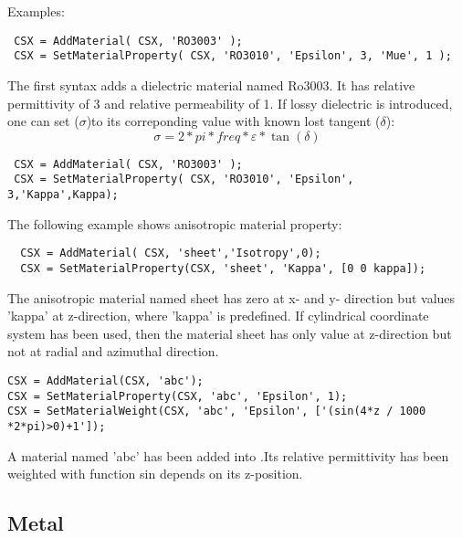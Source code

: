 \begin{FontDescr}{Examples:}

\begin{lstlisting}
 CSX = AddMaterial( CSX, 'RO3003' );
 CSX = SetMaterialProperty( CSX, 'RO3010', 'Epsilon', 3, 'Mue', 1 );
\end{lstlisting}
 
 The first syntax adds a dielectric material named Ro3003. It has relative permittivity of 3 and relative permeability of 1. If lossy dielectric is introduced, one can set 
($\sigma$)to its correponding value with known lost tangent ($\delta$): \begin{equation}
\sigma=2*pi*freq*\varepsilon*\tan(\delta)
\end{equation} 
\begin{lstlisting}
 CSX = AddMaterial( CSX, 'RO3003' );
 CSX = SetMaterialProperty( CSX, 'RO3010', 'Epsilon', 3,'Kappa',Kappa);
\end{lstlisting}

The following example shows anisotropic material property: 

\begin{lstlisting} 
  CSX = AddMaterial( CSX, 'sheet','Isotropy',0);
  CSX = SetMaterialProperty(CSX, 'sheet', 'Kappa', [0 0 kappa]);
\end{lstlisting}

The anisotropic material named sheet has zero  at x- and y- direction but values 'kappa' at z-direction, where 'kappa' is predefined. If cylindrical coordinate system has been used, then the material sheet has only value at z-direction but not at radial and azimuthal direction. 
    
\begin{lstlisting} 
CSX = AddMaterial(CSX, 'abc');
CSX = SetMaterialProperty(CSX, 'abc', 'Epsilon', 1);
CSX = SetMaterialWeight(CSX, 'abc', 'Epsilon', ['(sin(4*z / 1000 *2*pi)>0)+1']);
\end{lstlisting}

A material named 'abc' has been added into \hyperref[CSX]{}.Its relative permittivity has been weighted with function sin depends on its z-position. 

\end{FontDescr}


\subsection{Metal}\label{subsection_metal}
 
 

